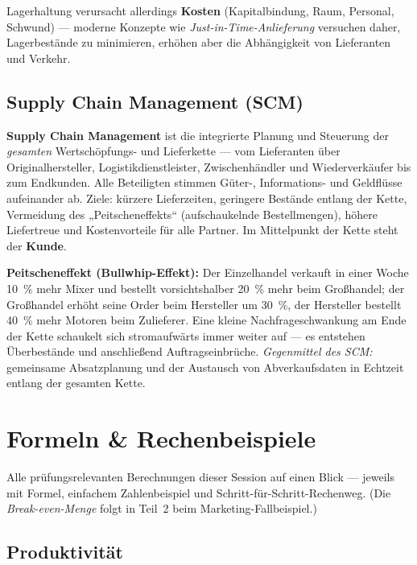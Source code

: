 \documentclass[11pt, a4paper]{article}
\begin{document}
Lagerhaltung verursacht allerdings \textbf{Kosten} (Kapitalbindung, Raum, Personal,
Schwund) --- moderne Konzepte wie \emph{Just-in-Time-Anlieferung} versuchen daher,
Lagerbestände zu minimieren, erhöhen aber die Abhängigkeit von Lieferanten und Verkehr.

\subsection{Supply Chain Management (SCM)}

\textbf{Supply Chain Management} ist die integrierte Planung und Steuerung der
\emph{gesamten} Wertschöpfungs- und Lieferkette --- vom Lieferanten über Originalhersteller,
Logistikdienstleister, Zwischenhändler und Wiederverkäufer bis zum Endkunden. Alle
Beteiligten stimmen Güter-, Informations- und Geldflüsse aufeinander ab. Ziele: kürzere
Lieferzeiten, geringere Bestände entlang der Kette, Vermeidung des „Peitscheneffekts``
(aufschaukelnde Bestellmengen), höhere Liefertreue und Kostenvorteile für alle Partner.
Im Mittelpunkt der Kette steht der \textbf{Kunde}.

\begin{beispiel}
\textbf{Peitscheneffekt (Bullwhip-Effekt):} Der Einzelhandel verkauft in einer Woche
10~\% mehr Mixer und bestellt vorsichtshalber 20~\% mehr beim Großhandel; der
Großhandel erhöht seine Order beim Hersteller um 30~\%, der Hersteller bestellt 40~\%
mehr Motoren beim Zulieferer. Eine kleine Nachfrageschwankung am Ende der Kette
schaukelt sich stromaufwärts immer weiter auf --- es entstehen Überbestände und
anschließend Auftragseinbrüche. \emph{Gegenmittel des SCM:} gemeinsame Absatzplanung
und der Austausch von Abverkaufsdaten in Echtzeit entlang der gesamten Kette.
\end{beispiel}

\section{Formeln \& Rechenbeispiele}

Alle prüfungsrelevanten Berechnungen dieser Session auf einen Blick --- jeweils mit
Formel, einfachem Zahlenbeispiel und Schritt-für-Schritt-Rechenweg. (Die
\emph{Break-even-Menge} folgt in Teil~2 beim Marketing-Fallbeispiel.)

\subsection{Produktivität}
\end{document}
